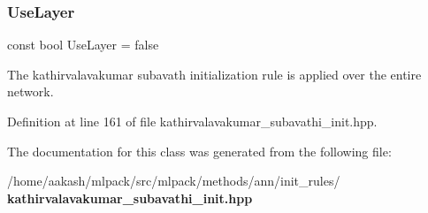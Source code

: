 \subsubsection{Use\+Layer}
{\footnotesize\ttfamily const bool Use\+Layer = false\hspace{0.3cm}{\ttfamily [static]}}



The kathirvalavakumar subavath initialization rule is applied over the entire network. 



Definition at line 161 of file kathirvalavakumar\+\_\+subavathi\+\_\+init.\+hpp.



The documentation for this class was generated from the following file\+:\begin{DoxyCompactItemize}
\item 
/home/aakash/mlpack/src/mlpack/methods/ann/init\+\_\+rules/\textbf{ kathirvalavakumar\+\_\+subavathi\+\_\+init.\+hpp}\end{DoxyCompactItemize}
